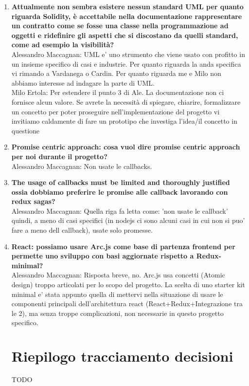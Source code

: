 \documentclass[Verbale171122.tex]{subfiles}
\begin{document}
\begin{enumerate}
	\item \textbf{Attualmente non sembra esistere nessun standard UML per quanto riguarda Solidity, è accettabile nella documentazione rappresentare un contratto come se fosse una classe nella programmazione ad oggetti e ridefinire gli aspetti che si discostano da quelli standard, come ad esempio la visibilità?}\\
	Alessandro Maccagnan: UML e' uno strumento che viene usato con profitto in un insieme specifico di casi e industrie. Per quanto riguarda la anda specifica vi rimando a Vardanega o Cardin. Per quanto riguarda me e Milo non abbiamo interesse ad indagare la parte di UML.\\
	Milo Ertola: Per estendere il punto 3 di Ale. La documentazione non ci fornisce alcun valore. Se avrete la necessità di spiegare, chiarire, formalizzare un concetto per poter proseguire nell'implementazione del progetto vi invitiamo caldamente di fare un prototipo che investiga l'idea/il concetto in questione\\
	\item \textbf{Promise centric approach: cosa vuol dire promise centric approach per noi durante il progetto?}\\
	Alessandro Maccagnan: Non usate le callbacks.\\
	\item \textbf{The usage of callbacks must be limited and thoroughly justified ossia dobbiamo preferire le promise alle callback lavorando con redux sagas?}\\
	Alessandro Maccagnan: Quella riga fa letta come: 'non usate le callback' quindi, a meno di casi specifici (in nodejs ci sono alcuni casi in cui non si puo' fare a meno dell callback), usate solo promesse.\\
	\item \textbf{React: possiamo usare Arc.js come base di partenza frontend per permette uno sviluppo con basi aggiornate rispetto a Redux-minimal?}\\
	Alessandro Maccagnan: Risposta breve, no. Arc.js usa concetti (Atomic design) troppo articolati per lo scopo del progetto. La scelta di uno starter kit minimal e' stata appunto quella di mettervi nella situazione di usare le componenti principali dell'architettura react (React+Redux+Integrazione tra le 2), ma senza troppe complicazioni, non necessarie in questo progetto specifico.\\
\section{Riepilogo tracciamento decisioni}	
	TODO\\
\end{enumerate}
\end{document}

